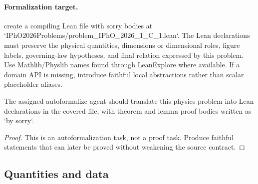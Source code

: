 \paragraph{Formalization target.}
create a compiling Lean file with sorry bodies at `IPhO2026Problems/problem\_IPhO\_2026\_1\_C\_1.lean`.
The Lean declarations must preserve the physical quantities, dimensions or dimensional roles, figure labels, governing-law hypotheses, and final relation expressed by this problem.
Use Mathlib/Physlib names found through LeanExplore where available. If a domain API is missing, introduce faithful local abstractions rather than scalar placeholder aliases.

\begin{theorem}
\label{thm:physics:IPhO_2026_1_C_1:target}
The assigned autoformalize agent should translate this physics problem into Lean declarations in the covered file, with theorem and lemma proof bodies written as `by sorry`.
\end{theorem}
\begin{proof}
This is an autoformalization task, not a proof task. Produce faithful statements that can later be proved without weakening the source contract.
\end{proof}

\subsection*{Quantities and data}

